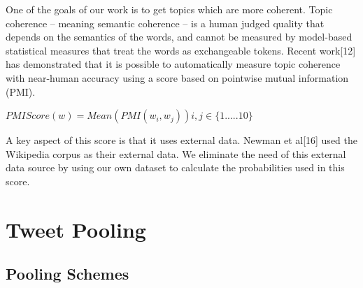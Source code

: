 \documentclass[10pt,a5paper,twoside]{article}
\begin{document}
One of the goals of our work is to get topics which are more coherent. Topic coherence – meaning semantic coherence – is a human judged quality that depends on the semantics of the words, and cannot be measured by model-based statistical measures that treat the words as exchangeable tokens. Recent work[12] has demonstrated that it is possible to automatically measure topic coherence with near-human accuracy using a score based on pointwise mutual information (PMI).

\begin{center}
$ PMI Score(w) = Mean ( PMI(w_i,w_j) ) i,j \in \lbrace1.....10\rbrace $
\end{center}

A key aspect of this score is that it uses external data. Newman et al[16] used the Wikipedia corpus as their external data. We eliminate the need of this external data source by using our own dataset to calculate the probabilities used in this score.\\


\section{Tweet Pooling}

\subsection{Pooling Schemes}

\end{document}
